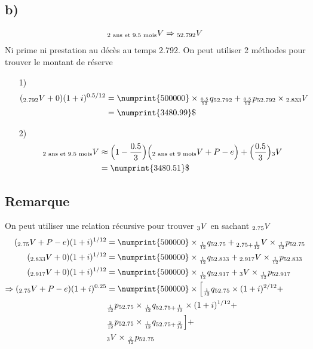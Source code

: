 \documentclass[11pt,french]{report}
\newcommand{\indiceGauche}[2]{{\vphantom{#2}}_{#1}#2}
\begin{document}
\subsection*{b) } 
\begin{align*}
\indiceGauche{\text{2 ans et 9.5 mois}}{V} &\Rightarrow \indiceGauche{52.792}{V} \\
\end{align*}
Ni prime ni prestation au décès au temps 2.792. On peut utiliser 2 méthodes pour trouver le montant de réserve
\begin{itemize}
\item[1)]\begin{align*}
(\indiceGauche{2.792}{V} +0)(1+i)^{0.5/12} &= \numprint{500000}\times \indiceGauche{\frac{0.5}{12}}{q}_{52.792} +  \indiceGauche{\frac{0.5}{12}}{p}_{52.792}\times \indiceGauche{2.833}{V}\\
&= \numprint{3480.99}\$
\end{align*}
\item[2)] \begin{align*}
\indiceGauche{\text{2 ans et 9.5 mois}}{V} &\approx \Big(1 - \frac{0.5}{3} \Big) \Big(\indiceGauche{\text{2 ans et 9 mois}}{V} +P - e \Big) + \Big(\frac{0.5}{3} \Big)\indiceGauche{3}{V} \\
&= \numprint{3480.51}\$
\end{align*}
\end{itemize}


\subsection*{Remarque}
On peut utiliser une relation récursive pour trouver $\indiceGauche{3}{V} $ en sachant $\indiceGauche{2.75}{V}$
\begin{align*}
(\indiceGauche{2.75}{V} + P - e) (1+i)^{1/12} &= \numprint{500000}\times \indiceGauche{\frac{1}{12}}{q}_{52.75} + \indiceGauche{2.75 + \frac{1}{12}}{V} \times \indiceGauche{\frac{1}{12}}{p}_{52.75} \\
(\indiceGauche{2.833}{V} + 0) (1+i)^{1/12} &= \numprint{500000}\times \indiceGauche{\frac{1}{12}}{q}_{52.833} + \indiceGauche{2.917 }{V} \times \indiceGauche{\frac{1}{12}}{p}_{52.833}\\
(\indiceGauche{2.917}{V} + 0) (1+i)^{1/12} &= \numprint{500000}\times \indiceGauche{\frac{1}{12}}{q}_{52.917} + \indiceGauche{3}{V} \times \indiceGauche{\frac{1}{12}}{p}_{52.917}\\
\Rightarrow (\indiceGauche{2.75}{V} + P - e) (1+i)^{0.25} &= \numprint{500000}\times \Big[\indiceGauche{\frac{1}{12}}{q}_{52.75} \times (1+i)^{2/12} + \\
& \indiceGauche{\frac{1}{12}}{p}_{52.75} \times \indiceGauche{\frac{1}{12}}{q}_{52.75+\frac{1}{12}} \times (1+i)^{1/12} + \\
&\indiceGauche{\frac{2}{12}}{p}_{52.75} \times \indiceGauche{\frac{1}{12}}{q}_{52.75+\frac{2}{12}}\Big] + \\
& \indiceGauche{3}{V} \times \indiceGauche{\frac{2}{12}}{p}_{52.75}
\end{align*}
\end{document}
